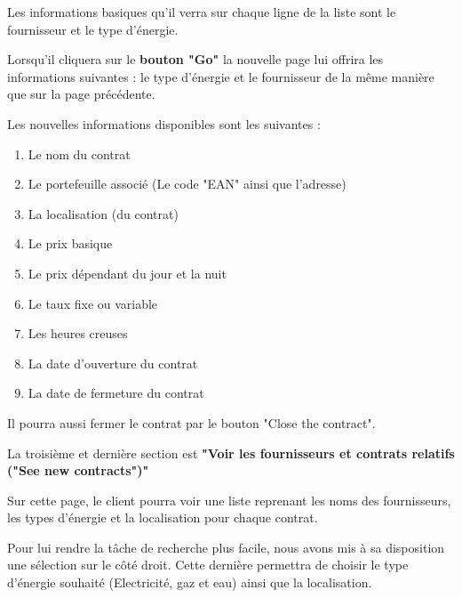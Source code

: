 \begin{flushleft}
Les informations basiques qu'il verra sur chaque ligne de la liste sont le fournisseur et le type d'énergie.
\end{flushleft}

\begin{flushleft}
Lorsqu'il cliquera sur le \textbf{bouton "Go"} la nouvelle page lui offrira les informations suivantes : le type d'énergie et le fournisseur de la même manière que sur la page précédente.
\end{flushleft}
\begin{flushleft}
Les nouvelles informations disponibles sont les suivantes :
\end{flushleft}
\begin{enumerate}
\item Le nom du contrat
\item Le portefeuille associé (Le code "EAN" ainsi que l'adresse)
\item La localisation (du contrat)
\item Le prix basique
\item Le prix dépendant du jour et la nuit
\item Le taux fixe ou variable
\item Les heures creuses
\item La date d'ouverture du contrat
\item La date de fermeture du contrat
\end{enumerate}
\begin{flushleft}
Il pourra aussi fermer le contrat par le bouton "Close the contract".
\end{flushleft}

\newpage

\begin{flushleft}
La troisième et dernière section est \textbf{"Voir les fournisseurs et contrats relatifs ("See new contracts")"}
\end{flushleft}
\begin{flushleft}
Sur cette page, le client pourra voir une liste reprenant les noms des fournisseurs, les types d'énergie et la localisation pour chaque contrat.
\end{flushleft}
\begin{flushleft}
Pour lui rendre la tâche de recherche plus facile, nous avons mis à sa disposition une sélection sur le côté droit.
Cette dernière permettra de choisir le type d'énergie souhaité (Electricité, gaz et eau) ainsi que la localisation.
\end{flushleft}

